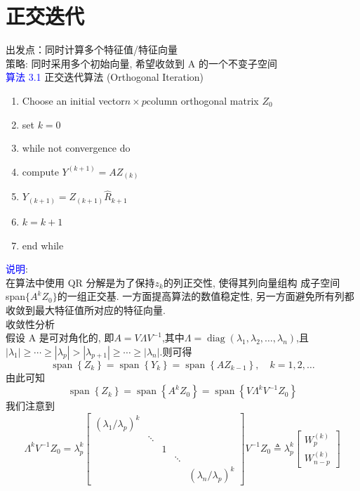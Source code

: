 \documentclass[12pt,a4paper]{article}
\begin{document}
\section{正交迭代}
\noindent 出发点：同时计算多个特征值/特征向量\\
策略: 同时采用多个初始向量, 希望收敛到 A 的一个不变子空间\\
\textcolor{blue}{算法 3.1} 正交迭代算法 (Orthogonal Iteration)\\
\begin{enumerate}[1:]
\item Choose an initial vector$n\times p$column orthogonal matrix $Z_{0}$ 
\item set $k=0$
\item while not convergence do
\item \qquad compute $Y^{(k+1)} = AZ_{(k)}$
\item \qquad$Y_{(k+1)}=Z_{(k+1)}\hat{R}_{k+1}$
\item \qquad$k=k+1$
\item end while
\end{enumerate}
\textcolor{blue}{说明}:\\
在算法中使用 QR 分解是为了保持$z_k$的列正交性, 使得其列向量组构 成子空间 span$\{A^kZ_0\}$的一组正交基. 一方面提高算法的数值稳定性, 另一方面避免所有列都收敛到最大特征值所对应的特征向量.\\
收敛性分析\\
假设 A 是可对角化的, 即$A=V \Lambda V^{-1}$,其中$\Lambda=\operatorname{diag}\left(\lambda_{1}, \lambda_{2}, \ldots, \lambda_{n}\right)$,且$\left|\lambda_{1}\right| \geq \cdots \geq\left|\lambda_{p}\right|>\left|\lambda_{p+1}\right| \geq \cdots \geq\left|\lambda_{n}\right|$.则可得
$$
\operatorname{span}\left\{Z_{k}\right\}=\operatorname{span}\left\{Y_{k}\right\}=\operatorname{span}\left\{A Z_{k-1}\right\}, \quad k=1,2, \ldots
$$
由此可知
$$
\operatorname{span}\left\{Z_{k}\right\}=\operatorname{span}\left\{A^{k} Z_{0}\right\}=\operatorname{span}\left\{V \Lambda^{k} V^{-1} Z_{0}\right\}
$$
我们注意到
$$
\Lambda^{k} V^{-1} Z_{0}=\lambda_{p}^{k}\left[\begin{array}{ccccc}
{\left(\lambda_{1} / \lambda_{p}\right)^{k}} & {} & {} &{}&{}\\ 
{} & {\ddots} & {} & {} &{}\\
 {} & {} & {1}& {} & {} \\ 
{} & {} & {} & {\ddots} & {} \\
 {} & {} & {} & {} & {\left(\lambda_{n} / \lambda_{p}\right)^{k}}
 \end{array}\right]V^{-1} Z_{0} \triangleq \lambda_{p}^{k}\left[\begin{array}{c}
 {W_{p}^{(k)}} \\ 
 {W_{n-p}^{(k)}}
 \end{array}\right]
$$
\end{document}
